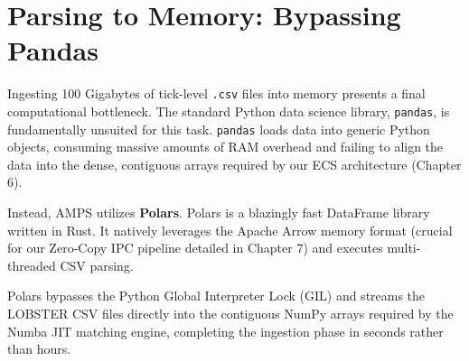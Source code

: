 \section{Parsing to Memory: Bypassing Pandas}

Ingesting 100 Gigabytes of tick-level \texttt{.csv} files into memory presents a final computational bottleneck. The standard Python data science library, \texttt{pandas}, is fundamentally unsuited for this task. \texttt{pandas} loads data into generic Python objects, consuming massive amounts of RAM overhead and failing to align the data into the dense, contiguous arrays required by our ECS architecture (Chapter 6).

Instead, AMPS utilizes \textbf{Polars}. Polars is a blazingly fast DataFrame library written in Rust. It natively leverages the Apache Arrow memory format (crucial for our Zero-Copy IPC pipeline detailed in Chapter 7) and executes multi-threaded CSV parsing. 

Polars bypasses the Python Global Interpreter Lock (GIL) and streams the LOBSTER CSV files directly into the contiguous NumPy arrays required by the Numba JIT matching engine, completing the ingestion phase in seconds rather than hours.
